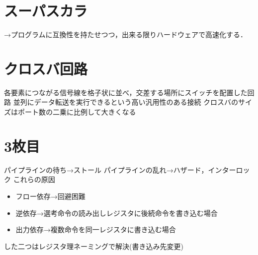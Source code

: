 \documentclass[a4paper,11pt]{ltjsarticle}
\begin{document}
\section{スーパスカラ}
→プログラムに互換性を持たせつつ，出来る限りハードウェアで高速化する．
\section{クロスバ回路}
各要素につながる信号線を格子状に並べ，交差する場所にスイッチを配置した回路
並列にデータ転送を実行できるという高い汎用性のある接続
クロスバのサイズはポート数の二乗に比例して大きくなる
\section{3枚目}
パイプラインの待ち→ストール
パイプラインの乱れ→ハザード，インターロック
これらの原因
\begin{itemize}
    \item フロー依存→回避困難
    \item 逆依存→選考命令の読み出しレジスタに後続命令を書き込む場合
    \item 出力依存→複数命令を同一レジスタに書き込む場合
\end{itemize}
した二つはレジスタ理ネーミングで解決(書き込み先変更)
\end{document}
